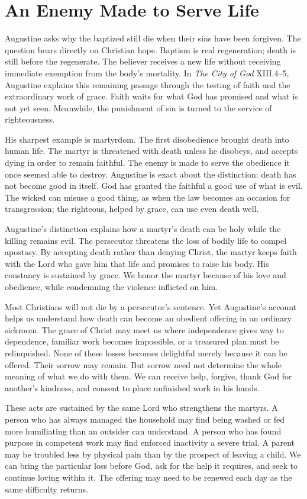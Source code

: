 \section{An Enemy Made to Serve Life}

Augustine asks why the baptized still die when their sins have been forgiven. The question bears directly on Christian hope. Baptism is real regeneration; death is still before the regenerate. The believer receives a new life without receiving immediate exemption from the body's mortality. In \emph{The City of God} XIII.4--5, Augustine explains this remaining passage through the testing of faith and the extraordinary work of grace. Faith waits for what God has promised and what is not yet seen. Meanwhile, the punishment of sin is turned to the service of righteousness.

His sharpest example is martyrdom. The first disobedience brought death into human life. The martyr is threatened with death unless he disobeys, and accepts dying in order to remain faithful. The enemy is made to serve the obedience it once seemed able to destroy. Augustine is exact about the distinction: death has not become good in itself. God has granted the faithful a good use of what is evil. The wicked can misuse a good thing, as when the law becomes an occasion for transgression; the righteous, helped by grace, can use even death well.

Augustine's distinction explains how a martyr's death can be holy while the killing remains evil. The persecutor threatens the loss of bodily life to compel apostasy. By accepting death rather than denying Christ, the martyr keeps faith with the Lord who gave him that life and promises to raise his body. His constancy is sustained by grace. We honor the martyr because of his love and obedience, while condemning the violence inflicted on him.

Most Christians will not die by a persecutor's sentence. Yet Augustine's account helps us understand how death can become an obedient offering in an ordinary sickroom. The grace of Christ may meet us where independence gives way to dependence, familiar work becomes impossible, or a treasured plan must be relinquished. None of these losses becomes delightful merely because it can be offered. Their sorrow may remain. But sorrow need not determine the whole meaning of what we do with them. We can receive help, forgive, thank God for another's kindness, and consent to place unfinished work in his hands.

These acts are sustained by the same Lord who strengthens the martyrs. A person who has always managed the household may find being washed or fed more humiliating than an outsider can understand. A person who has found purpose in competent work may find enforced inactivity a severe trial. A parent may be troubled less by physical pain than by the prospect of leaving a child. We can bring the particular loss before God, ask for the help it requires, and seek to continue loving within it. The offering may need to be renewed each day as the same difficulty returns.

